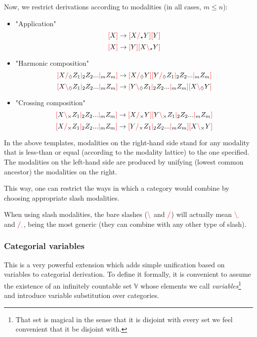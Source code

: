 \documentclass[main.tex]{subfiles}
\begin{document}
Now, we restrict derivations according to modalities (in all cases, $m \leq n$):
\begin{itemize}
    \item "Application"
        \[ \lb X \rb \rightarrow \lb X \rc_\modstar Y \rb \lb Y \rb \]
        \[ \lb X \rb \rightarrow \lb Y \rb \lb X \lc_\modstar Y \rb \]
    \item "Harmonic composition"
        \[ \lb X \rc_\modr Z_1 \mc_2 Z_2 ... \mc_m Z_m \rb \rightarrow \lb X \rc_\modr Y \rb \lb Y \rc_\modr Z_1 \mc_2 Z_2 ... \mc_m Z_m \rb \]
        \[ \lb X \lc_\modr Z_1 \mc_2 Z_2 ... \mc_m Z_m \rb \rightarrow \lb Y \lc_\modr Z_1 \mc_2 Z_2 ... \mc_m Z_m \rb \lb X \lc_\modr Y \rb \]
    \item "Crossing composition"
        \[ \lb X \lc_\modx Z_1 \mc_2 Z_2 ... \mc_m Z_m \rb \rightarrow \lb X \rc_\modx Y \rb \lb Y \lc_\modx Z_1 \mc_2 Z_2 ... \mc_m Z_m \rb \]
        \[ \lb X \rc_\modx Z_1 \mc_2 Z_2 ... \mc_m Z_m \rb \rightarrow \lb Y \rc_\modx Z_1 \mc_2 Z_2 ... \mc_m Z_m \rb \lb X \lc_\modx Y \rb \]
\end{itemize}

In the above templates, modalities on the right-hand side stand for any
modality that is less-than or equal (according to the modality lattice)
to the one specified. The modalities on the left-hand side are produced by
unifying (lowest common ancestor) the modalities on the right.


This way, one can restrict the ways in which a category would
combine by choosing appropriate slash modalities.

When using slash modalities, the bare slashes ($\lc$ and $\rc$) will actually
mean $\lc_\moddot$ and $\rc_\moddot$, being the most generic (they
can combine with any other type of slash).

\subsubsection{Categorial variables}
This is a very powerful extension which adds simple unification based on variables
to categorial derivation. To define it formally, it is convenient to assume
the existence of an infinitely countable set $\mathbb{V}$ whose elements
we call \emph{variables}\footnote{That set is magical in the sense that it is
    disjoint with every set we feel convenient that it be disjoint with.}
and introduce variable substitution over categories.
\end{document}
